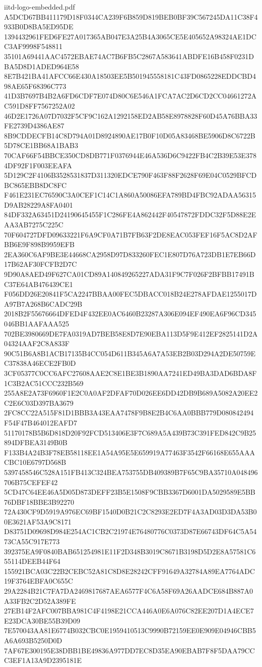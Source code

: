 \begin{filecontents*}[overwrite]{iitd-logo-embedded.pdf}
A5DCD67BB411179D18F0344CA239F6B859D819BEB0BF39C567245DA11C38F4933B0D8BA5ED95DE
1394432961FED6FE27A017365AB047E3A25B4A3065CE5E405652A98324AE1DCC3AF9998F548811
35101A69441AAC4572EBAE74AC7B6FB5C2867A583641ABDFE16B458F0231DBA5D8D1ADED964E58
8E7B421BA41AFCC66E430A18503EE5B501945558181C43FD0865228EDDCBD498AE65F68396C773
41D3B7697B4B2A6FD6CDF7E074D80C6E546A1FCA7AC2D6CD2CC04661272AC591D8FF7567252A02
46D2E1726A07D7032F5CF9C162A1292158ED2AB58E8978828F60D45A76BBA33FE2739D4386AE87
8B9CDDECFB14C8D794A01D8924890AE17B0F10D05A83468BE5906D8C6722B5D78CE1BB68A1BAB3
70CAF66F54BBCE350CD8DB771F0376944E46A536D6C9422FB4C2B39E53E3784DF92F1F003EEAFA
5D129C2F4106B3528531837D311320EDCE790F463F88F2628F69E04C0529BFCDBC865EBB8DC8FC
F461E231EC76590C3A0CEF1C14C1A860A50086EFA789BD4FBC92ADAA56315D9AB28229A8FA0401
84DF332A63451D24190645455F1C286FE4A862442F40547872FDDC32F5D88E2EAA3AB7275C225C
70F604727DFD09633221F6A9CF0A71B7FB63F2DE8EAC053FEF16F5AC8D2AFBB6E9F898B9959EFB
2EA360C6AF9BE3E44668CA2958D97D833260FEC1E807D76A723DB1E7EB66D17B62AF30FCFB2D7C
9D90A8AED49F627CA01CD89A140849265227ADA31F9C7F026F2BFBB17491BC37E64AB476439CE1
F056DD26E20841F5CA2247BBAA00FEC5DBACC018B24E278AFDAE1255017DA97B7A268B6CADC29B
2018B2F55676664DFED4F432EE0AC6460B23287A306E094EF490EA6F96CD345046BB1AAFAAA525
702BE3980669DE7FA0319AD7BEB58E8D7E90EBA113D5F9E412EF2825141D2A04324AAF2C8A833F
90C51B6A8B1ACB17135B4CC054D611B345A6A7A53EB2B03D294A2DE50759EC37838A46ECE2FB0D
3CF05377C0CC6AFC27608AAE2C8E1BE3B1890AA7241ED49BA3DAD6BDA8F1C3B2AC51CCC232B569
255A8E2A73F6960F1E2C0A0AF2DFAF70D026EE6DD42DB9B689A5082A20EE2C2E6C03D397BA3679
2FC8CC22A515F81D1BBB3A43EAA7478F9B8E2B4C6AA0BBB779D080842494F54F47B464012EAFD7
51170178B5B6D818D20F92FCD513406E3F7C689A5A439B73C391FED842C9B25894DFBEA3149B0B
F133B4A24B3F78EB58118EE1A54A95E5E659919A77463F3542F66168E655AAACBC10E6797D568B
5397458546C528A151FB413C324BEA753755DB409389B7F65C9BA35710A048496706B75CEFEF42
5CD47C64EE46A5D05D873DEFF23B5E1508F9CBB3367D6001DA5029589E5BB76DBF18BBE3B92270
72A430CF9D5919A976EC69BF1540D0B21C2C8293E2ED7F4A3AD03D3DA53B00E3621AF53A9C8171
D83751D09698D984E254AC1CB2C21974E76480776C0373D87E66743DF64C5A5473CA55C917E773
392375EA9F0840BAB651254981E11F2D348B3019C8671B3198D5D2E8A57581C655114DEEB44F64
155921BCA03C22B2CEBC52A81C8D8E28242CFF91649A32784A89EA7764ADC19F3764EBFA0C655C
29A2284B21C7FA7DA2469817687AEA6577F4C6A58F69A26AADCE684B887A0A33FB2C2D52A389FE
27EB14F2AFC007BBA981C4F4198E21CCA446A0E6A076C82EE207D1A4ECE7E23DCA30BE55B39D09
7E570043AA81E6774B032CBC0E1959410513C9990B72159EE0E909E04946CBB5A6A693B5250D0D
7AF67E300195E38DBB1BE49836A977DD7EC8D35EA90EBAB7F8F5DAA79CCC3EF1A13A9D2395181E

\end{filecontents*}
